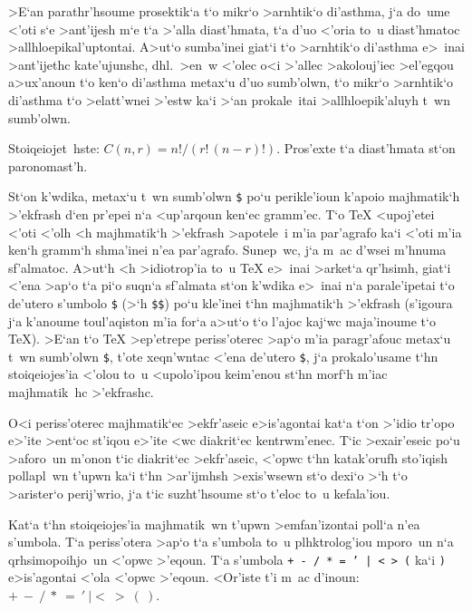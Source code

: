 \toindex{\sp}
\toindex{;}
\toindex{>}
\toindex{,}
\toindex{!}

>E`an parathr'hsoume prosektik`a t`o mikr`o >arnhtik`o di'asthma, j`a
do~ume <'oti s`e >ant'ijesh m`e t`a >'alla diast'hmata, t`a d'uo <'oria
to~u diast'hmatoc >allhlo\-epikal'u\-ptontai.  A>ut`o sumba'inei giat`i
t`o >arnhtik`o di'asthma e>~inai >ant'ijethc kate'ujunshc, dhl.\ >en~w
<'olec o<i >'allec >akolouj'iec >el'egqou a>ux'anoun t`o ken`o di'asthma
metax`u d'uo sumb'olwn, t`o mikr`o >arnhtik`o di'asthma t`o >elatt'wnei
>'estw ka`i >`an prokale~itai >allhlo\-epi\-k'aluyh t~wn sumb'olwn.

\exercise Stoiqeiojet~hste: $C(n,r) = n!/(r!\,(n-r)!)$\null.
Pros'exte t`a diast'h\-ma\-ta st`on paronomast'h.    
\bigskip

St`on k'wdika, metax`u t~wn sumb'olwn {\tt \$} po`u perikle'ioun k'apoio
majhmatik`h >'ekfrash d`en pr'epei n`a <up'arqoun ken`ec gramm'ec.  T`o
{\rm\TeX} <upoj'etei <'oti <'olh <h majhmatik`h  >'ekfrash >apotele~i
m'ia par'agrafo ka`i <'oti m'ia ken`h gramm`h shma'inei n'ea par'agrafo.
 Sunep~wc, j`a m~ac d'wsei m'h\-nu\-ma sf'almatoc.  A>ut`h <h
>idiotrop'ia to~u {\rm \TeX} e>~inai >arket`a qr'hsimh, giat`i <'ena
>ap`o t`a pi`o suqn`a sf'almata st`on k'wdika e>~inai n`a parale'ipetai
t`o de'utero s'umbolo {\tt \$} (>`h {\tt \$\$}) po`u kle'i\-nei t`hn
majhmatik`h >'ekfrash (s'igoura j`a k'anoume toul'aqiston m'ia for`a
a>ut`o t`o l'ajoc kaj`wc maja'i\-noume t`o {\rm\TeX})\null.  >E`an t`o
{\rm\TeX} >ep'etrepe periss'oterec >ap`o m'ia paragr'afouc metax`u t~wn
sumb'olwn {\tt \$}, t'ote xeqn'wntac <'ena de'utero {\tt\$}, j`a
prokalo'usame t`hn stoiqeiojes'ia <'olou to~u <upolo'ipou keim'enou
st`hn morf`h m'iac  majhmatik~hc >'ekfrashc.

O<i periss'oterec majhmatik`ec >ekfr'aseic e>is'agontai kat`a t`on
>'idio tr'opo e>'ite >ent`oc st'iqou e>'ite <wc diakrit`ec
kentrwm'enec. T`ic >exair'eseic po`u >aforo~un m'onon t`ic diakrit`ec
>ekfr'aseic, <'opwc t`hn katak'orufh sto'iqish pollapl~wn t'upwn ka`i
t`hn >ar'ijmhsh >exis'wsewn st`o dexi`o >`h t`o >arister`o perij'wrio,
j`a t`ic suzht'hsoume st`o t'eloc to~u kefala'iou.

Kat`a t`hn stoiqeiojes'ia majhmatik~wn t'upwn >emfan'izontai poll`a n'ea
s'umbola.  T`a peris\-s'otera >ap`o t`a s'umbola to~u plhktrolog'iou
mporo~un n`a qrhsimopoihjo~un <'opwc >'eqoun.  T`a s'umbola {\tt + - / *
= ' | < > (} ka`i {\tt)} e>is'agontai <'ola <'opwc >'eqoun.  <Or'iste
t'i m~ac d'inoun:  $+ \>  - \> / \> * \> = \> ' \> | < \> > \> ( \> )$.

